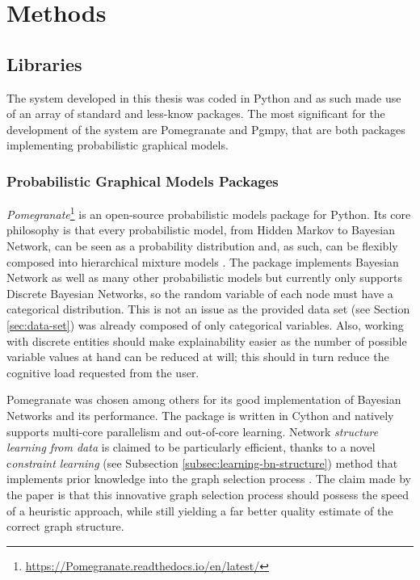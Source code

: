 
\section{Methods} \label{sec:methods}

\subsection{Libraries}\label{subsec:libraries}
The system developed in this thesis was coded in Python and as such made use of an array of standard and less-know packages.
The most significant for the development of the system are Pomegranate and Pgmpy, that are both packages implementing probabilistic graphical models.

\subsubsection{Probabilistic Graphical Models Packages}
\textit{Pomegranate}\footnote{\url{https://Pomegranate.readthedocs.io/en/latest/}} is an open-source probabilistic models package for Python.
Its core philosophy is that every probabilistic model, from Hidden Markov to Bayesian Network, can be seen as a probability distribution and, as such, can be flexibly composed into hierarchical mixture models \citep{Schreiber2017}.
The package implements Bayesian Network as well as many other probabilistic models but currently only supports Discrete Bayesian Networks, so the random variable of each node must have a categorical distribution.
This is not an issue as the provided data set (see Section \ref{sec:data-set}) was already composed of only categorical variables.
Also, working with discrete entities should make explainability easier as the number of possible variable values at hand can be reduced at will; this should in turn reduce the cognitive load requested from the user.

Pomegranate was chosen among others for its good implementation of Bayesian Networks and its performance.
The package is written in Cython and natively supports multi-core parallelism and out-of-core learning.
Network \textit{structure learning from data} is claimed to be particularly efficient, thanks to a novel c\textit{onstraint learning} (see Subsection \ref{subsec:learning-bn-structure}) method that implements prior knowledge into the graph selection process \citep{schreiber_noble_2017}.
The claim made by the paper is that this innovative graph selection process should possess the speed of a heuristic approach, while still yielding a far better quality estimate of the correct graph structure.

